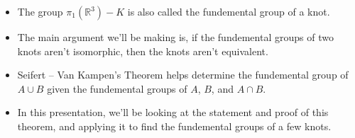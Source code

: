\documentclass[8pt]{beamer}
\begin{document}
\begin{frame}
\begin{columns}
\begin{column}{0.5\textwidth}
\begin{itemize}
          \item
            The group $\pi_1(\mathbb{R}^3) - K$ is also called the fundemental
            group of a knot.

          \item
            The main argument we'll be making is, if the fundemental groups of
            two knots aren't isomorphic, then the knots aren't equivalent.

          \item
            Seifert -- Van Kampen's Theorem helps determine the fundemental
            group of $A \cup B$ given the fundemental groups of $A$, $B$, and
            $A \cap B$.

          \item
            In this presentation, we'll be looking at the statement and proof
            of this theorem, and applying it to find the fundemental groups of a
            few knots.
        \end{itemize}
      \end{column}
    \end{columns}
  \end{frame}
\end{document}
